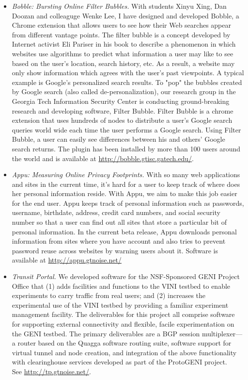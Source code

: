 \documentclass{article}
\begin{document}
\begin{cv}{}
\begin{itemize}
\item {\em Bobble: Bursting Online Filter Bubbles.} With students Xinyu
  Xing, Dan Doozan and colleaguge Wenke Lee, I have designed and
  developed Bobble, a Chrome extension that allows users to see how
  their Web searches appear from different vantage points.  The filter
  bubble is a concept developed by Internet activist Eli Pariser in his
  book to describe a phenomenon in which websites use algorithms to
  predict what information a user may like to see based on the user's
  location, search history, etc. As a result, a website may only show
  information which agrees with the user's past viewpoints. A typical
  example is Google's personalized search results. To "pop" the bubbles
  created by Google search (also called de-personalization), our
  research group in the Georgia Tech Information Security Center is
  conducting ground-breaking research and developing software, Filter
  Bubble. Filter Bubble is a chrome extension that uses hundreds of
  nodes to distribute a user's Google search queries world wide each
  time the user performs a Google search. Using Filter Bubble, a user
  can easily see differences between his and others' Google search
  returns.  The plugin has been installed by more than 100 users around
  the world and is available at \url{http://bobble.gtisc.gatech.edu/}.

\item {\em Appu: Measuring Online Privacy Footprints.}  With so many web
  applications and sites in the current time, it's hard for a user to
  keep track of where does her personal information reside. With Appu,
  we aim to make this job easier for the end user. Appu keeps track of
  personal information such as passwords, username, birthdate, address,
  credit card numbers, and social security number so that a user can
  find out all sites that store a particular bit of personal
  information.  In the current beta release, Appu downloads personal
  information from sites where you have account and also tries to
  prevent password reuse across websites by warning users about
  it. Software is available at \url{http://appu.gtnoise.net/}

\item {\em Transit Portal.} We developed software for the
  NSF-Sponsored GENI Project Office that (1) adds facilities
  and functions to the VINI testbed to enable experiments to carry
  traffic from real users; and (2) increases the experimental use of the
  VINI testbed by providing a familiar experiment management
  facility. The deliverables for this project all comprise software for
  supporting external connectivity and flexible, facile experimentation
  on the GENI testbed. The primary deliverables are a BGP session
  multiplexer---a router based on the Quagga software routing suite,
  software support for virtual tunnel and node creation, and integration
  of the above functionality with clearinghouse services developed as
  part of the ProtoGENI project.  \\ See
  \url{http://tp.gtnoise.net/}.


\end{itemize}
\end{cv}
\end{document}
